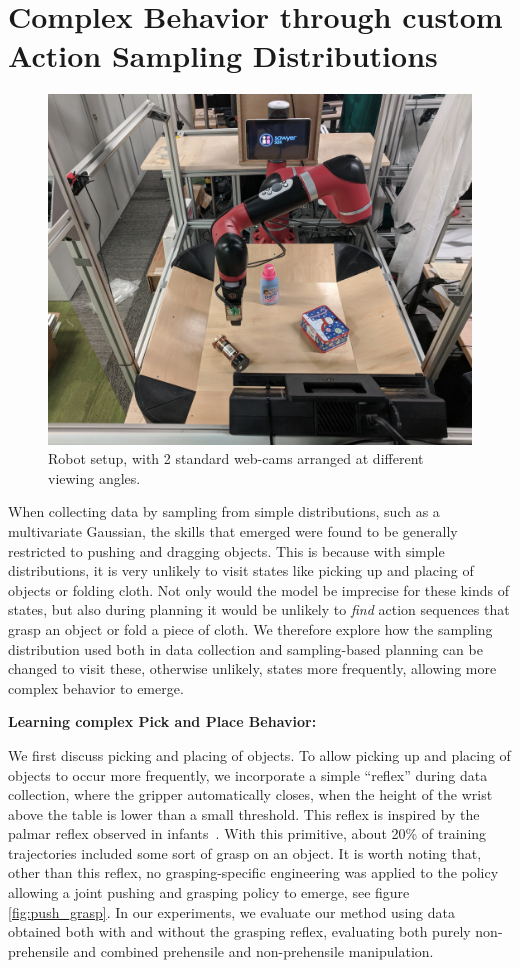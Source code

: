 \section{Complex Behavior through custom Action Sampling Distributions}
\begin{figure}
	\centering
	\includegraphics[width=0.7\linewidth]{images_general/robot_setup.jpg}
	\caption{\small{Robot setup, with 2 standard web-cams arranged at different viewing angles.}
		\label{fig:robot_setup}	}
\end{figure}
\label{sec:system}
When collecting data by sampling from simple distributions, such as a multivariate Gaussian, the skills that emerged were found to be generally restricted to pushing and dragging objects. This is because with simple distributions, it is very unlikely to visit states like picking up and placing of objects or folding cloth. Not only would the model be imprecise for these kinds of states, but also during planning it would be unlikely to \emph{find} action sequences that grasp an object or fold a piece of cloth. 
We therefore explore how the sampling distribution used both in data collection and sampling-based planning can be changed to visit these, otherwise unlikely, states more frequently, allowing more complex behavior to emerge. 

\noindent \textbf{Learning complex Pick and Place Behavior:}

We first discuss picking and placing of objects. To allow picking up and placing of objects to occur more frequently, we incorporate a simple ``reflex'' during data collection, where the gripper automatically closes, when the height of the wrist above the table is lower than a small threshold. This reflex is inspired by the palmar reflex observed in infants~\cite{grasping_fetal}. With this primitive, about 20\% of training trajectories included some sort of grasp on an object. It is worth noting that, other than this reflex, no grasping-specific engineering was applied to the policy allowing a joint pushing and grasping policy to emerge, see figure \ref{fig:push_grasp}. In our experiments, we evaluate our method using data obtained both with and without the grasping reflex, evaluating both purely non-prehensile and combined prehensile and non-prehensile manipulation.

